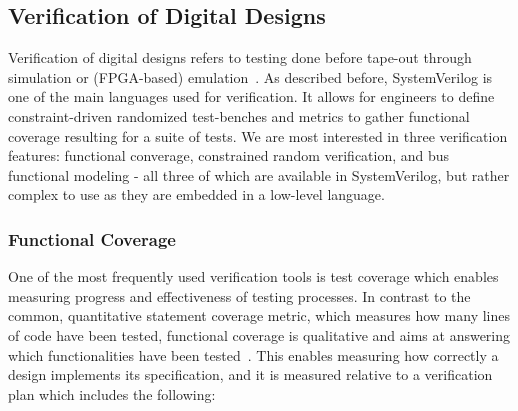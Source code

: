 \documentclass[conference]{IEEEtran}
\begin{document}
\subsection{Verification of Digital Designs}

Verification of digital designs refers to testing done before tape-out through simulation 
or (FPGA-based) emulation~\cite{spear2008systemverilog}. As described before, SystemVerilog is one 
of the main languages used for verification. It allows for engineers to define constraint-driven 
randomized test-benches and metrics to gather functional coverage resulting for a suite of 
tests. We are most interested in three verification features: functional converage, 
constrained random verification, and bus functional modeling - all three of which are available in 
SystemVerilog, but rather complex to use as they are embedded in a low-level language.

\subsubsection{Functional Coverage}

One of the most frequently used verification tools is test coverage which enables measuring 
progress and effectiveness of testing processes. In contrast to the common, quantitative statement 
coverage metric, which measures how many lines of code have been tested, functional coverage is 
qualitative and aims at answering which functionalities have been 
tested~\cite{spear2008systemverilog}. This enables measuring how correctly a design implements its 
specification, and it is measured relative to a verification plan which includes the following:
\end{document}
